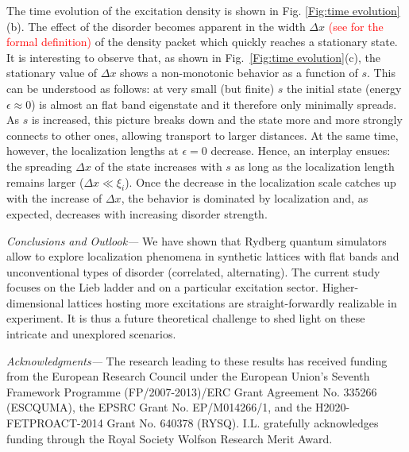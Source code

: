 \documentclass[prl,aps,twocolumn,showpacs,superscriptaddress,longbibliography]{revtex4-1}
\newcommand{\changer}[1]{\textcolor{red}{#1}}
\begin{document}
The time evolution of the excitation density is shown in Fig. \ref{Fig:time evolution}(b). The effect of the disorder becomes apparent in the width $\Delta x$ \changer{(see \cite{SM} for the formal definition)} of the density packet which quickly reaches a stationary state. It is interesting to observe that, as shown in Fig.~\ref{Fig:time evolution}(c), the stationary value of $\Delta x$ shows a non-monotonic behavior as a function of $s$. This can be understood as follows: at very small (but finite) $s$ the initial state (energy $\epsilon \approx 0$) is almost an flat band eigenstate and it therefore only minimally spreads. As $s$ is increased, this picture breaks down and the state more and more strongly connects to other ones, allowing transport to larger distances. At the same time, however, the localization lengths at $\epsilon = 0$ decrease. Hence, an interplay ensues: the spreading $\Delta x$ of the state increases with $s$ as long as the localization length remains larger ($\Delta x \ll \xi_i$). Once the decrease in the localization scale catches up with the increase of $\Delta x$, the behavior is dominated by localization and, as expected, decreases with increasing disorder strength.

\emph{Conclusions and Outlook---} We have shown that Rydberg quantum simulators allow to explore localization phenomena in synthetic lattices with flat bands and unconventional types of disorder (correlated, alternating). The current study focuses on the Lieb ladder and on a particular excitation sector. Higher-dimensional lattices hosting more excitations are straight-forwardly realizable in experiment. It is thus a future theoretical challenge to shed light on these intricate and unexplored scenarios.

\emph{Acknowledgments---} The research  leading  to  these  results  has  received  funding  from the European Research Council under the European Union’s Seventh Framework Programme (FP/2007-2013)/ERC Grant Agreement No.
335266 (ESCQUMA), the EPSRC Grant No. EP/M014266/1, and the H2020-FETPROACT-2014 Grant No. 640378 (RYSQ). I.L. gratefully acknowledges funding through the Royal Society Wolfson Research Merit Award.




\end{document}
